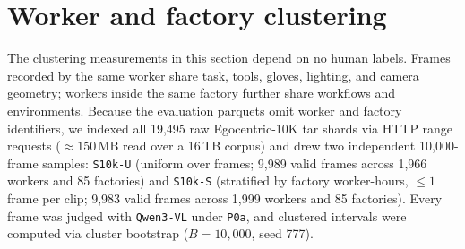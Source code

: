 \documentclass[11pt]{article}
\begin{document}
\section{Worker and factory clustering}
\label{sec:cluster}

The clustering measurements in this section depend on no human labels. Frames recorded by the same
worker share task, tools, gloves, lighting, and camera geometry; workers inside the same factory
further share workflows and environments. Because the evaluation parquets omit worker and factory
identifiers, we indexed all 19{,}495 raw Egocentric-10K tar shards via HTTP range requests
($\approx 150$\,MB read over a 16\,TB corpus) and drew two independent 10{,}000-frame samples:
\texttt{S10k-U} (uniform over frames; 9{,}989 valid frames across 1{,}966 workers and 85
factories) and \texttt{S10k-S} (stratified by factory worker-hours, $\leq 1$ frame per clip;
9{,}983 valid frames across 1{,}999 workers and 85 factories). Every frame was judged with
\texttt{Qwen3-VL} under \texttt{P0a}, and clustered intervals were computed via cluster bootstrap
($B = 10{,}000$, seed 777).

\begin{table}[t]
\centering\footnotesize

\caption{Raw-corpus clustering on \texttt{S10k-U} (1{,}966 workers, 85 factories) and
\texttt{S10k-S} (1{,}999 workers, 85 factories), $B = 10{,}000$, seed 777. Worker design effect
($\text{deff}_w$) is pre-registered (H2); exact unequal-cluster one-way ANOVA
$\hat{\rho}_w$ and factory-level design effect ($\text{deff}_f$, 85 clusters) are post hoc.}
\label{tab:deff}
\end{table}
\end{document}
